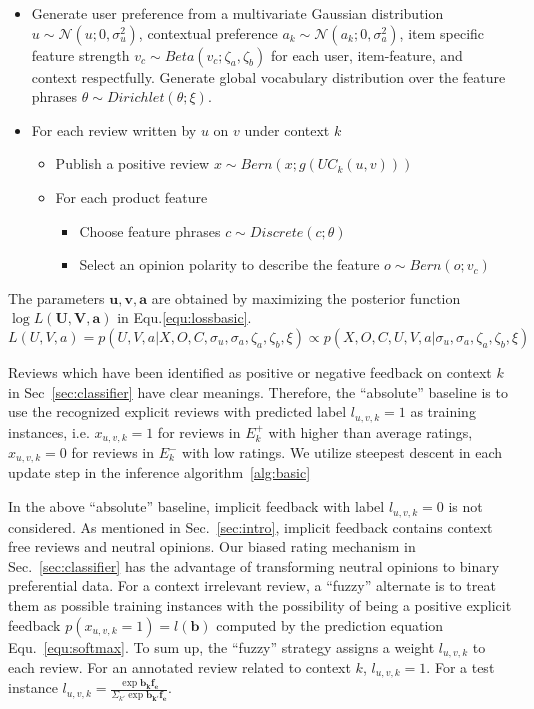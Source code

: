 \documentclass[preprint,12pt]{elsarticle}
\begin{document}
\begin{itemize}
	\item Generate user preference from a multivariate Gaussian distribution $u\sim \mathcal{N}(u;0,\sigma_u^2)$, contextual preference $a_k\sim \mathcal{N}(a_k;0,\sigma_a^2)$, item specific feature strength $v_c \sim Beta(v_c;\zeta_a,\zeta_b)$ for each user, item-feature, and context respectfully. Generate global vocabulary distribution over the feature phrases $\theta\sim Dirichlet(\theta;\xi)$.
	\item For each review written by $u$ on $v$ under context $k$
	\begin{itemize}
	\item Publish a positive review $x\sim Bern(x;g(UC_k(u,v)))$
	\item For each product feature
	\begin{itemize}
	\item Choose feature phrases $c\sim Discrete(c;\theta)$
	\item Select an opinion polarity to describe the feature $o \sim Bern(o;v_c)$
	\end{itemize}
	\end{itemize}
\end{itemize}

The parameters $\mathbf{u,v,a}$ are obtained by maximizing the posterior function $\log L(\mathbf{U},\mathbf{V},\mathbf{a})$ in Equ.\ref{equ:lossbasic}.
\begin{equation}\label{equ:lossbasic}
L(U,V,a)=p(U,V,a|X,O,C,\sigma_u,\sigma_a,\zeta_a,\zeta_b,\xi)\propto p(X,O,C,U,V,a|\sigma_u,\sigma_a,\zeta_a,\zeta_b,\xi)
\end{equation}

Reviews which have been identified as positive or negative feedback on context $k$ in Sec~\ref{sec:classifier} have clear meanings. Therefore, the ``absolute'' baseline is to use the recognized explicit reviews with predicted label $l_{u,v,k}=1$ as training instances, i.e. $x_{u,v,k}=1$ for reviews in $E^+_k$ with higher than average ratings, $x_{u,v,k}=0$ for reviews in $E^-_k$ with low ratings. We utilize steepest descent in each update step in the inference algorithm~\ref{alg:basic}  

In the above ``absolute'' baseline, implicit feedback with label $l_{u,v,k}=0$ is not considered. As mentioned in Sec.~\ref{sec:intro}, implicit feedback contains context free reviews and neutral opinions. Our biased rating mechanism in Sec.~\ref{sec:classifier} has the advantage of transforming neutral opinions to binary preferential data. For a context irrelevant review, a ``fuzzy'' alternate is to treat them as possible training instances with the possibility of being a positive explicit feedback $p(x_{u,v,k}=1)=l(\mathbf{b})$ computed by the prediction equation Equ.~\ref{equ:softmax}. To sum up, the ``fuzzy'' strategy assigns a weight $l_{u,v,k}$ to each review. For an annotated review related to context $k$, $l_{u,v,k}=1$. For a test instance  $l_{u,v,k}= \frac{\exp{\mathbf{b_k}\mathbf{f_e}}}{\Sigma_{k'} \exp{\mathbf{b_{k'}}\mathbf{f_e}}}$.  
\end{document}

